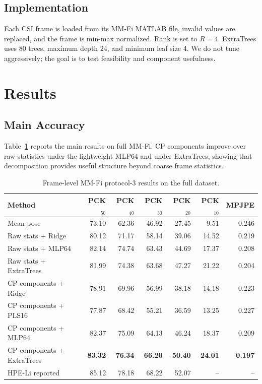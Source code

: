 \documentclass[letterpaper]{article}
\begin{document}
\subsection{Implementation}

Each CSI frame is loaded from its MM-Fi MATLAB file, invalid values are replaced, and the frame is min-max normalized. Rank is set to $R=4$. ExtraTrees uses 80 trees, maximum depth 24, and minimum leaf size 4. We do not tune aggressively; the goal is to test feasibility and component usefulness.

\section{Results}

\subsection{Main Accuracy}

Table~\ref{tab:main} reports the main results on full MM-Fi. CP components improve over raw statistics under the lightweight MLP64 and under ExtraTrees, showing that decomposition provides useful structure beyond coarse frame statistics.

\begin{table}[t]
\centering
\caption{Frame-level MM-Fi protocol-3 results on the full dataset.}
\label{tab:main}
\begin{tabular}{lrrrrrr}
\toprule
Method & PCK$_{50}$ & PCK$_{40}$ & PCK$_{30}$ & PCK$_{20}$ & PCK$_{10}$ & MPJPE \\
\midrule
Mean pose & 73.10 & 62.36 & 46.92 & 27.45 & 9.51 & 0.246 \\
Raw stats + Ridge & 80.12 & 71.17 & 58.14 & 39.06 & 14.52 & 0.219 \\
Raw stats + MLP64 & 82.14 & 74.74 & 63.43 & 44.69 & 17.37 & 0.208 \\
Raw stats + ExtraTrees & 81.99 & 74.38 & 63.68 & 47.27 & 21.22 & 0.204 \\
CP components + Ridge & 78.91 & 69.96 & 56.99 & 38.18 & 14.18 & 0.223 \\
CP components + PLS16 & 77.87 & 68.42 & 55.21 & 36.59 & 13.25 & 0.227 \\
CP components + MLP64 & 82.37 & 75.09 & 64.13 & 46.24 & 18.37 & 0.209 \\
CP components + ExtraTrees & \textbf{83.32} & \textbf{76.34} & \textbf{66.20} & \textbf{50.40} & \textbf{24.01} & \textbf{0.197} \\
HPE-Li reported & 85.12 & 78.18 & 68.22 & 52.07 & -- & -- \\
\bottomrule
\end{tabular}
\end{table}
\end{document}

